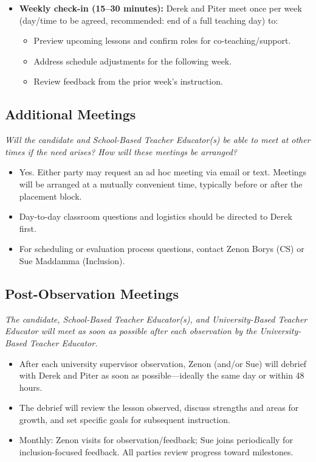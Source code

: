 \documentclass[10pt]{article}
\begin{document}
\begin{itemize}[leftmargin=*,itemsep=0.25em]
  \item \textbf{Weekly check-in (15--30 minutes):} Derek and Piter meet once per week (day/time to be agreed, recommended: end of a full teaching day) to:
  \begin{itemize}[leftmargin=1.5em,itemsep=0.1em]
    \item Preview upcoming lessons and confirm roles for co-teaching/support.
    \item Address schedule adjustments for the following week.
    \item Review feedback from the prior week's instruction.
  \end{itemize}
\end{itemize}

\subsection{Additional Meetings}
\textit{Will the candidate and School-Based Teacher Educator(s) be able to meet at other times if the need arises? How will these meetings be arranged?}

\begin{itemize}[leftmargin=*,itemsep=0.25em]
  \item Yes. Either party may request an ad hoc meeting via email or text. Meetings will be arranged at a mutually convenient time, typically before or after the placement block.
  \item Day-to-day classroom questions and logistics should be directed to Derek first.
  \item For scheduling or evaluation process questions, contact Zenon Borys (CS) or Sue Maddamma (Inclusion).
\end{itemize}

\subsection{Post-Observation Meetings}
\textit{The candidate, School-Based Teacher Educator(s), and University-Based Teacher Educator will meet as soon as possible after each observation by the University-Based Teacher Educator.}

\begin{itemize}[leftmargin=*,itemsep=0.25em]
  \item After each university supervisor observation, Zenon (and/or Sue) will debrief with Derek and Piter as soon as possible---ideally the same day or within 48 hours.
  \item The debrief will review the lesson observed, discuss strengths and areas for growth, and set specific goals for subsequent instruction.
  \item Monthly: Zenon visits for observation/feedback; Sue joins periodically for inclusion-focused feedback. All parties review progress toward milestones.
\end{itemize}
\end{document}
